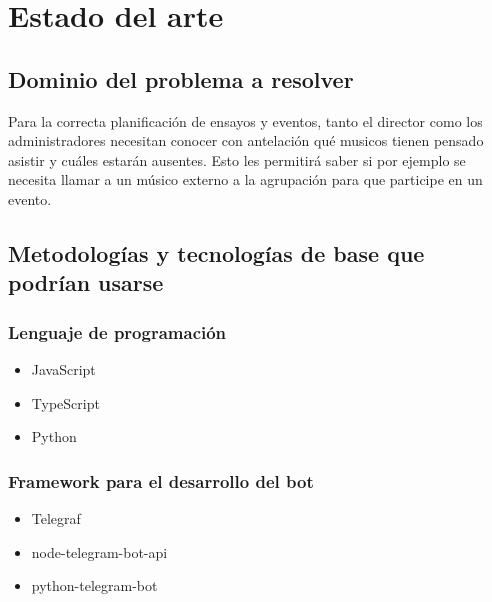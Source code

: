 \chapter{Estado del arte}


\section{Dominio del problema a resolver}





Para la correcta planificación de ensayos y eventos, tanto el director como los administradores necesitan conocer con antelación qué musicos tienen pensado asistir y cuáles estarán ausentes. Esto les permitirá saber si por ejemplo se necesita llamar a un músico externo a la agrupación para que participe en un evento.




\section{Metodologías y tecnologías de base que podrían usarse}

\subsection{Lenguaje de programación}

\begin{itemize}
    \item JavaScript
    \item TypeScript
    \item Python
\end{itemize}

\subsection{Framework para el desarrollo del bot}
\begin{itemize}
    \item Telegraf
    \item node-telegram-bot-api
    \item python-telegram-bot
\end{itemize}


